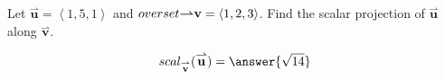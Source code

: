 \documentclass{ximera}
\author{Gregory Hartman \and Matthew Carr \and Bart Snapp}
\begin{document}
\begin{exercise}
Let $\overset{\boldsymbol{\rightharpoonup}}{\mathbf{u}} = \left< 1,5,1 \right>$ and $\\overset{\boldsymbol{\rightharpoonup}}{\mathbf{v}} = \left< 1,2,3 \right>$. Find the
scalar projection of $\overset{\boldsymbol{\rightharpoonup}}{\mathbf{u}}$ along $\overset{\boldsymbol{\rightharpoonup}}{\mathbf{v}}$.
\begin{prompt}
\[
scal_{\overset{\boldsymbol{\rightharpoonup}}{\mathbf{v}}}(\overset{\boldsymbol{\rightharpoonup}}{\mathbf{u}})=\answer{\sqrt{14}}
\]
\end{prompt}

\end{exercise}
\end{document}
